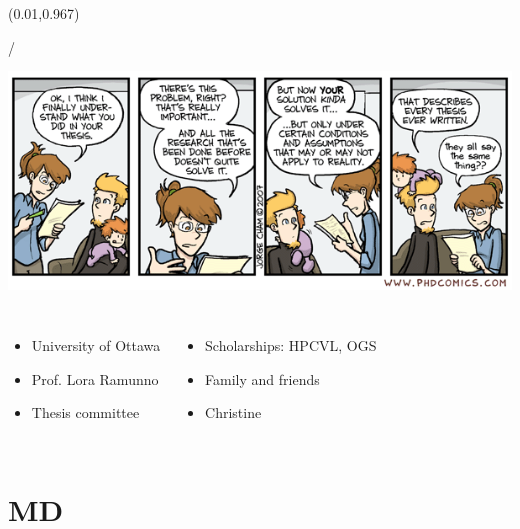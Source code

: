 \documentclass{beamer}
\makeatletter
\newcommand{\framenumber}{
\begin{textblock}{0}(0.01,0.967)
\begin{scriptsize}
{\color{gray}\insertframenumber/\inserttotalframenumber}
\end{scriptsize}
\end{textblock}
}
\makeatother
\begin{document}
\begin{frame}{}\framenumber

\includegraphics[width=\textwidth]{figures/phd052107s}

\begin{columns}[t]

\begin{itemize}
\item University of Ottawa
\item Prof. Lora Ramunno
\item Thesis committee
\end{itemize}

\begin{itemize}
\item Scholarships: HPCVL, OGS
\item Family and friends
\item Christine
\end{itemize}

\end{columns}
\end{frame}






\appendix


\section{MD}
\end{document}
